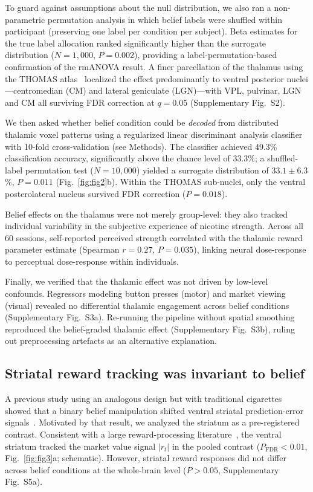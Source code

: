 \documentclass[11pt]{article}
\begin{document}
To guard against assumptions about the null distribution, we also ran a non-parametric permutation analysis in which belief labels were shuffled within participant (preserving one label per condition per subject). Beta estimates for the true label allocation ranked significantly higher than the surrogate distribution ($N=1{,}000$, $P=0.002$), providing a label-permutation-based confirmation of the rmANOVA result. A finer parcellation of the thalamus using the THOMAS atlas~\cite{mcleod2017spatially} localized the effect predominantly to ventral posterior nuclei---centromedian (CM) and lateral geniculate (LGN)---with VPL, pulvinar, LGN and CM all surviving FDR correction at $q=0.05$ (Supplementary Fig.~S2).

We then asked whether belief condition could be \textit{decoded} from distributed thalamic voxel patterns using a regularized linear discriminant analysis classifier~\cite{haber2010reward} with 10-fold cross-validation (see Methods). The classifier achieved 49.3\% classification accuracy, significantly above the chance level of 33.3\%; a shuffled-label permutation test ($N=10{,}000$) yielded a surrogate distribution of $33.1 \pm 6.3$\%, $P=0.011$ (Fig.~\ref{fig:fig2}b). Within the THOMAS sub-nuclei, only the ventral posterolateral nucleus survived FDR correction ($P=0.018$).

Belief effects on the thalamus were not merely group-level: they also tracked individual variability in the subjective experience of nicotine strength. Across all 60 sessions, self-reported perceived strength correlated with the thalamic reward parameter estimate (Spearman $r=0.27$, $P=0.035$), linking neural dose-response to perceptual dose-response within individuals.

Finally, we verified that the thalamic effect was not driven by low-level confounds. Regressors modeling button presses (motor) and market viewing (visual) revealed no differential thalamic engagement across belief conditions (Supplementary Fig.~S3a). Re-running the pipeline without spatial smoothing reproduced the belief-graded thalamic effect (Supplementary Fig.~S3b), ruling out preprocessing artefacts as an alternative explanation.

\subsection{Striatal reward tracking was invariant to belief}

A previous study using an analogous design but with traditional cigarettes showed that a binary belief manipulation shifted ventral striatal prediction-error signals~\cite{gu2015belief}. Motivated by that result, we analyzed the striatum as a pre-registered contrast. Consistent with a large reward-processing literature~\cite{haber2010reward,schultz1997neural}, the ventral striatum tracked the market value signal $|r_t|$ in the pooled contrast ($P_\text{FDR} < 0.01$, Fig.~\ref{fig:fig3}a; schematic). However, striatal reward responses did not differ across belief conditions at the whole-brain level ($P>0.05$, Supplementary Fig.~S5a).
\end{document}
